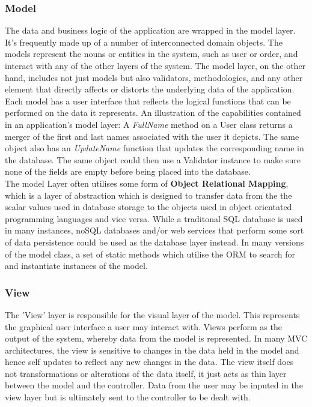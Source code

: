 \subsubsection{Model}
The data and business logic of the application are wrapped in the model layer.
It's frequently made up of a number of interconnected domain objects.
The models represent the nouns or entities in the system, such as user or order, and interact with any of the other layers of the system.  
\newline The model layer, on the other hand, includes not just models but also validators, methodologies, and any other element that directly affects or distorts the underlying data of the application. \newline \\ 
Each model has a user interface that reflects the logical functions that can be performed on the data it represents.
An illustration of the capabilities contained in an application's model layer: A \textit{FullName} method on a User class returns a merger of the first and last names associated with the user it depicts. The same object also has an \textit{UpdateName} function that updates the corresponding name in the database. The same object could then use a Validator instance to make sure none of the fields are empty before being placed into the database.  \newline \\
The model Layer often utilises some form of \textbf{Object Relational Mapping},  which is a layer of abstraction which is designed to transfer data from the the scalar values used in database storage to the objects used in object orientated programming languages and vice versa.  While a traditonal SQL database is used in many instances,  noSQL databases and/or web services that perform some sort of data persistence could be used as the database layer instead. 
\newline In many versions of the model class,  a set of static methods which utilise the ORM to search for and instantiate instances of the model.
\subsubsection{View}
The 'View' layer is responsible for the visual layer of the model.  This represents the graphical user interface a user may interact with. Views perform as the output of the system, whereby data from the model is represented.  In many MVC architectures,  the view is sensitive to changes in the data held in the model and hence self updates to reflect any new changes in the data.  The view itself does not transformations or alterations of the data itself,  it just acts as thin layer between the model and the controller.  Data from the user may be inputed in the view layer but is ultimately sent to the controller to be dealt with.
